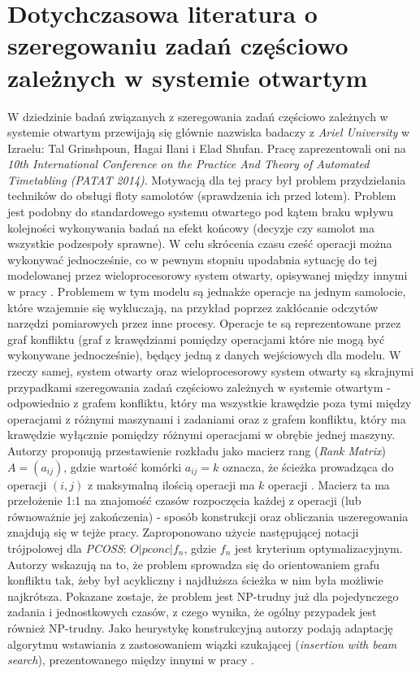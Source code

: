 \documentclass[brudnopis]{xmgr}
\begin{document}
\section{Dotychczasowa literatura o szeregowaniu zadań częściowo zależnych w systemie otwartym}
W dziedzinie badań związanych z szeregowania zadań częściowo zależnych w systemie otwartym przewijają się głównie nazwiska badaczy z \emph{Ariel University} w Izraelu: Tal Grinshpoun, Hagai Ilani i Elad Shufan. Pracę \cite{grinshpoun2014partially} zaprezentowali oni na \emph{10th International Conference on the Practice And Theory of Automated Timetabling (PATAT 2014)}. Motywacją dla tej pracy był problem przydzielania techników do obsługi floty samolotów (sprawdzenia ich przed lotem). Problem jest podobny do standardowego systemu otwartego pod kątem braku wpływu kolejności wykonywania badań na efekt końcowy (decyzje czy samolot ma wszystkie podzespoły sprawne). W celu skrócenia czasu cześć operacji można wykonywać jednocześnie, co w pewnym stopniu upodabnia sytuację do tej modelowanej przez wieloprocesorowy system otwarty, opisywanej między innymi w pracy \cite{adakmultiprocessor}. Problemem w tym modelu są jednakże operacje na jednym samolocie, które wzajemnie się wykluczają, na przykład poprzez zakłócanie odczytów narzędzi pomiarowych przez inne procesy. Operacje te są reprezentowane przez graf konfliktu (graf z krawędziami pomiędzy operacjami które nie mogą być wykonywane jednocześnie), będący jedną z danych wejściowych dla modelu. W rzeczy samej, system otwarty oraz wieloprocesorowy system otwarty są skrajnymi przypadkami szeregowania zadań częściowo zależnych w systemie otwartym - odpowiednio z grafem konfliktu, który ma wszystkie krawędzie poza tymi między operacjami z różnymi maszynami i zadaniami oraz z grafem konfliktu, który ma krawędzie wyłącznie pomiędzy różnymi operacjami w obrębie jednej maszyny.\\
Autorzy proponują przestawienie rozkładu jako macierz rang (\emph{Rank Matrix}) $A = (a_{ij})$, gdzie wartość komórki $a_{ij} = k$ oznacza, że ścieżka prowadząca do operacji $(i, j)$ z maksymalną ilością operacji ma $k$ operacji \cite{brasel2008heuristic}. Macierz ta ma przełożenie 1:1 na znajomość czasów rozpoczęcia każdej z operacji (lub równoważnie jej zakończenia) - sposób konstrukcji oraz obliczania uszeregowania znajdują się w tejże pracy. Zaproponowano użycie następującej notacji trójpolowej dla \emph{PCOSS}: $O|pconc|f_n$, gdzie $f_n$ jest kryterium optymalizacyjnym. Autorzy wskazują na to, że problem sprowadza się do orientowaniem grafu konfliktu tak, żeby był acykliczny i najdłuższa ścieżka w nim była możliwie najkrótsza. Pokazane zostaje, że problem jest NP-trudny już dla pojedynczego zadania i jednostkowych czasów, z czego wynika, że ogólny przypadek jest również NP-trudny. Jako heurystykę konstrukcyjną autorzy podają adaptację algorytmu wstawiania z zastosowaniem wiązki szukającej (\emph{insertion with beam search}), prezentowanego między innymi w pracy \cite{brasel1993constructive}.
\medskip
\end{document}
